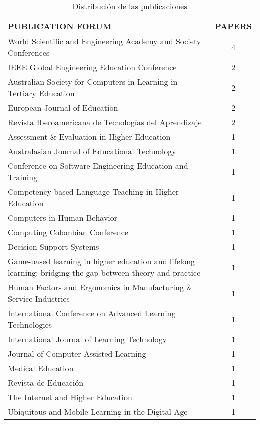 \begin{table}[H]
  \begin{center}
  \begin{tabular}{| m{12cm} | c |}
    \hline
    PUBLICATION FORUM & PAPERS\\
    \hline
    \hline 
    World Scientific and Engineering Academy and Society Conferences & 4\\
    \hline
    IEEE Global Engineering Education Conference & 2\\
    \hline
    Australian Society for Computers in Learning in Tertiary Education & 2\\
    \hline
    European Journal of Education & 2\\
    \hline
    Revista Iberoamericana de Tecnologías del Aprendizaje & 2\\
    \hline
    Assessment \& Evaluation in Higher Education & 1\\
    \hline
    Australasian Journal of Educational Technology & 1\\
    \hline
    Conference on Software Engineering Education and Training & 1\\
    \hline
    Competency-based Language Teaching in Higher Education & 1\\
    \hline
    Computers in Human Behavior & 1\\
    \hline
    Computing Colombian Conference & 1\\
    \hline
    Decision Support Systems & 1\\
    \hline
    Game-based learning in higher education and lifelong learning: bridging the gap between theory and practice & 1\\
    \hline
    Human Factors and Ergonomics in Manufacturing \& Service Industries & 1\\
    \hline
    International Conference on Advanced Learning Technologies & 1\\
    \hline
    International Journal of Learning Technology & 1\\
    \hline
    Journal of Computer Assisted Learning & 1\\
    \hline
    Medical Education & 1\\
    \hline
    Revista de Educación & 1\\
    \hline
    The Internet and Higher Education & 1\\
    \hline
    Ubiquitous and Mobile Learning in the Digital Age & 1 \\
    \hline
  \end{tabular}
\end{center}
\caption{Distribución de las publicaciones}
\label{tab:DistribucionPublicaciones}
\end{table} 



